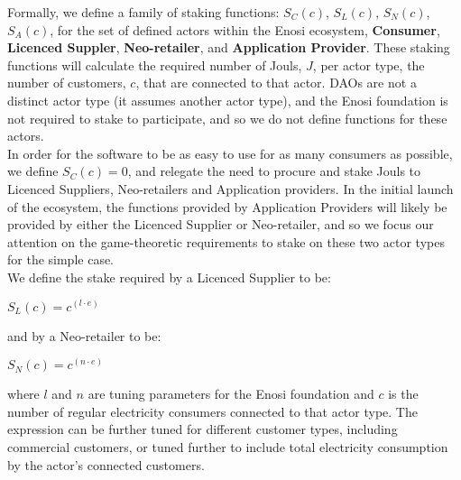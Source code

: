 \documentclass{article}
\theoremstyle{definition}
\theoremstyle{plain} %
\begin{document}
\noindent Formally, we define a family of staking functions: $S_C(c)$, $S_L(c)$, $S_N(c)$, $S_A(c)$, for the set of defined actors within the Enosi ecosystem, \textbf{Consumer}, \textbf{Licenced Suppler}, \textbf{Neo-retailer}, and \textbf{Application Provider}. These staking functions will calculate the required number of Jouls, $J$, per actor type, the number of customers, $c$, that are connected to that actor. DAOs are not a distinct actor type (it assumes another actor type), and the Enosi foundation is not required to stake to participate, and so we do not define functions for these actors. \\

\noindent In order for the software to be as easy to use for as many consumers as possible, we define $S_C(c) = 0$, and relegate the need to procure and stake Jouls to Licenced Suppliers, Neo-retailers and Application providers. In the initial launch of the ecosystem, the functions provided by Application Providers will likely be provided by either the Licenced Supplier or Neo-retailer, and so we focus our attention on the game-theoretic requirements to stake on these two actor types for the simple case. \\

\noindent We define the stake required by a Licenced Supplier to be: \\

\begin{center}
$S_L(c) = c^{(l \cdot e)}$
\end{center}

\noindent and by a Neo-retailer to be: \\

\begin{center}
$S_N(c) = c^{(n \cdot e)}$
\end{center}

\noindent where $l$ and $n$ are tuning parameters for the Enosi foundation and $c$ is the number of regular electricity consumers connected to that actor type. The expression can be further tuned for different customer types, including commercial customers, or tuned further to include total electricity consumption by the actor's connected customers. \\

\vspace{5mm}

\begin{center}
\end{center}
\end{document}
